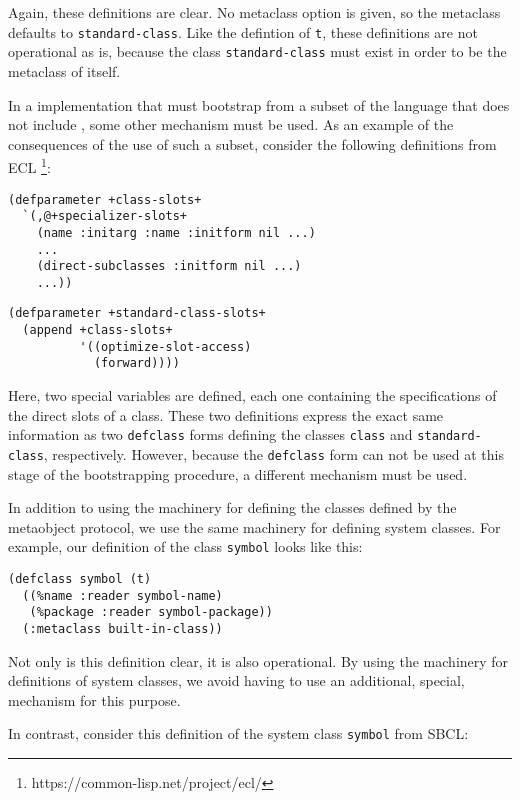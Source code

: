 \noindent
Again, these definitions are clear.  No metaclass option is given, so
the metaclass defaults to \texttt{standard-class}.  Like the defintion
of \texttt{t}, these definitions are not operational as is, because
the class \texttt{standard-class} must exist in order to be the
metaclass of itself.

In a \commonlisp{} implementation that must bootstrap \clos{} from a
subset of the language that does not include \clos{}, some other
mechanism must be used.  As an example of the consequences of the use
of such a subset, consider the following definitions from ECL%
\footnote{https://common-lisp.net/project/ecl/}:

\begin{verbatim}
(defparameter +class-slots+
  `(,@+specializer-slots+
    (name :initarg :name :initform nil ...)
    ...
    (direct-subclasses :initform nil ...)
    ...))
\end{verbatim}

\begin{verbatim}
(defparameter +standard-class-slots+
  (append +class-slots+
          '((optimize-slot-access)
            (forward))))
\end{verbatim}

\noindent
Here, two special variables are defined, each one containing the
specifications of the direct slots of a class.  These two definitions
express the exact same information as two \texttt{defclass} forms
defining the classes \texttt{class} and \texttt{standard-class},
respectively.  However, because the \texttt{defclass} form can not be
used at this stage of the bootstrapping procedure, a different mechanism
must be used.

In addition to using the \clos{} machinery for defining the classes
defined by the metaobject protocol, we use the same machinery for
defining system classes.  For example, our definition of the class
\texttt{symbol} looks like this:

\begin{verbatim}
(defclass symbol (t)
  ((%name :reader symbol-name)
   (%package :reader symbol-package))
  (:metaclass built-in-class))
\end{verbatim}

\noindent
Not only is this definition clear, it is also operational.  By using
the \clos{} machinery for definitions of system classes, we avoid
having to use an additional, special, mechanism for this purpose.

In contrast, consider this definition of the system class
\texttt{symbol} from SBCL:

